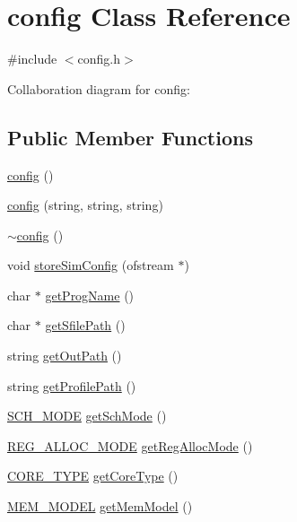 \hypertarget{classconfig}{
\section{config Class Reference}
\label{classconfig}
}


{\ttfamily \#include $<$config.h$>$}



Collaboration diagram for config:
\subsection*{Public Member Functions}
\begin{DoxyCompactItemize}
\item 
\hyperlink{classconfig_ab1b245308f26ce7979e4c37e93869706}{config} ()
\item 
\hyperlink{classconfig_a2927ae142b867cba0bfcf3bd9b39760f}{config} (string, string, string)
\item 
\hyperlink{classconfig_a9b8b1ccf97780676a19296f72fee3aae}{$\sim$config} ()
\item 
void \hyperlink{classconfig_a147b2e07b1e0849a4113997acd333e6a}{storeSimConfig} (ofstream $\ast$)
\item 
char $\ast$ \hyperlink{classconfig_a9530da432f14dc0e96f794e13475e4be}{getProgName} ()
\item 
char $\ast$ \hyperlink{classconfig_a9dd0b4405d19c26884b5db734d4e5bb7}{getSfilePath} ()
\item 
string \hyperlink{classconfig_a7cccd557a2366138d69f2335acebb7eb}{getOutPath} ()
\item 
string \hyperlink{classconfig_a11cb0f8db74961c153d3637de5d842cc}{getProfilePath} ()
\item 
\hyperlink{binaryTranslator_2global_8h_a81dba944bc61f5b25a3513766ef6651b}{SCH\_\-MODE} \hyperlink{classconfig_acdfce653f4bad57644645e96aaa2a4cc}{getSchMode} ()
\item 
\hyperlink{binaryTranslator_2global_8h_a78dd04e0a4364ff551d83095f9bc0264}{REG\_\-ALLOC\_\-MODE} \hyperlink{classconfig_aae32bca45b60d2f07c5c85f43de94435}{getRegAllocMode} ()
\item 
\hyperlink{global_2global_8h_ab65a1cfe05166d06195718a9587d7b86}{CORE\_\-TYPE} \hyperlink{classconfig_a70f8fcc3a60527665fb2491e5d0b61c0}{getCoreType} ()
\item 
\hyperlink{global_2global_8h_a0685c5d42062f018dda85c9d62f3ac1f}{MEM\_\-MODEL} \hyperlink{classconfig_ab46ed06bcb9d53d8c45b0f327dd1b07a}{getMemModel} ()
\item 

\end{DoxyCompactItemize}
